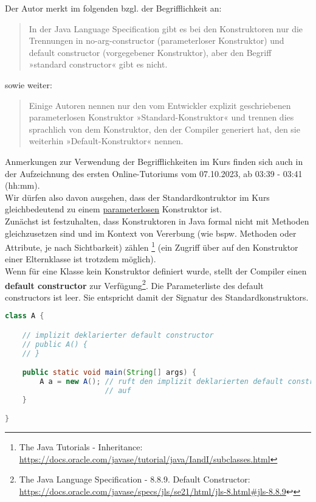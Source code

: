 Der Autor merkt im folgenden bzgl. der Begrifflichkeit an:

\blockquote[{\cite[516]{Ull12}}]{
    In der Java Language Specification gibt es bei den Konstruktoren nur die Trennungen in no-arg-constructor
    (parameterloser Konstruktor) und default constructor (vorgegebener Konstruktor), aber den Begriff
    »standard constructor« gibt es nicht.
}

sowie weiter:

\blockquote[{\cite[517]{Ull12}}]{
    Einige Autoren nennen nur den vom Entwickler explizit geschriebenen parameterlosen Konstruktor »Standard-Konstruktor«
    und trennen dies sprachlich von dem Konstruktor, den der Compiler generiert hat, den sie weiterhin »Default-Konstruktor« nennen.
}

Anmerkungen zur Verwendung der Begrifflichkeiten im Kurs finden sich auch in der Aufzeichnung des ersten Online-Tutoriums
vom 07.10.2023, ab 03:39 - 03:41 (hh:mm).\\

Wir dürfen also davon ausgehen, dass der Standardkontruktor im Kurs gleichbedeutend zu einem \underline{parameterlosen}
Konstruktor ist.\\

Zunächst ist festzuhalten, dass Konstruktoren in Java formal nicht mit Methoden gleichzusetzen sind und im Kontext von
Vererbung  (wie bspw. Methoden oder Attribute, je nach Sichtbarkeit)
zählen \footnote{
    The Java Tutorials - Inheritance: \url{https://docs.oracle.com/javase/tutorial/java/IandI/subclasses.html}
} (ein Zugriff über  auf den Konstruktor einer Elternklasse ist trotzdem möglich).\\

Wenn für eine Klasse kein Konstruktor definiert wurde, stellt der Compiler einen \textbf{default constructor}
zur Verfügung\footnote{
    The Java Language Specification - 8.8.9. Default Constructor: \url{https://docs.oracle.com/javase/specs/jls/se21/html/jls-8.html#jls-8.8.9}↩
}.
Die Parameterliste des default constructors ist leer.
Sie entspricht damit der Signatur des Standardkonstruktors.

\begin{lstlisting}[language=java]
class A {

    // implizit deklarierter default constructor
    // public A() {
    // }

    public static void main(String[] args) {
        A a = new A(); // ruft den implizit deklarierten default constructor
                       // auf
    }

}
\end{lstlisting}

